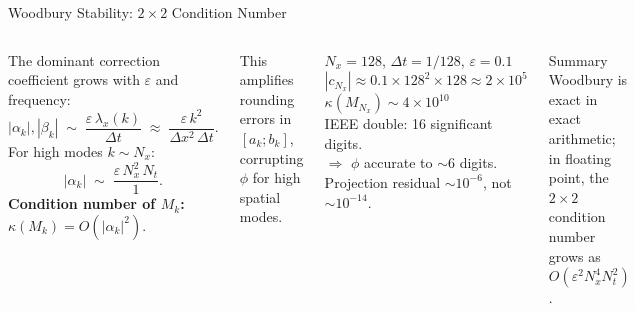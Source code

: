 \documentclass[10pt,aspectratio=169]{beamer}
\newcommand{\eps}{\varepsilon}
\newcommand{\lx}{\lambda_x}
\begin{document}
\begin{frame}{Woodbury Stability: $2{\times}2$ Condition Number}
  \begin{columns}[T]
    The dominant correction coefficient grows with $\eps$ and frequency:
    \[
      |\alpha_k|,|\beta_k| \;\sim\; \frac{\eps\,\lx(k)}{\Delta t}
          \;\approx\; \frac{\eps\,k^2}{\Delta x^2\,\Delta t}.
    \]
    For high modes $k\sim N_x$:
    \[
      |\alpha_k| \;\sim\; \frac{\eps\,N_x^2\,N_t}{1}.
    \]
    \textbf{Condition number of $M_k$:}
    $\kappa(M_k) = O(|\alpha_k|^2).$

    This amplifies rounding errors in $[a_k;b_k]$,
    corrupting $\phi$ for high spatial modes.

    \begin{exampleblock}{$N_x=128$, $\Delta t=1/128$, $\eps=0.1$}
      $|c_{N_x}| \approx 0.1\times 128^2\times 128 \approx 2\times10^5$\\
      $\kappa(M_{N_x}) \sim 4\times10^{10}$\\[4pt]
      IEEE double: 16 significant digits.\\
      $\Rightarrow$ $\phi$ accurate to $\sim6$ digits.\\
      Projection residual $\sim10^{-6}$, not $\sim10^{-14}$.
    \end{exampleblock}

    \begin{alertblock}{Summary}
      Woodbury is exact in exact arithmetic; in floating point, the
      $2{\times}2$ condition number grows as
      $O(\eps^2 N_x^4 N_t^2)$.
    \end{alertblock}
  \end{columns}
\end{frame}
\end{document}
